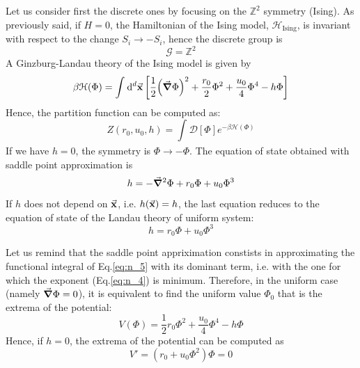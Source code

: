 \documentclass[../main/main.tex]{subfiles}
\begin{document}
Let us consider first the discrete ones by focusing on the \( \mathbb{Z}^2 \) symmetry (Ising).
As previously said, if \( H=0 \), the Hamiltonian of the Ising model, \( \mathcal{H}_{\text{Ising}} \), is invariant with respect to the change \( S_i \rightarrow -S_i \), hence the discrete group is
\begin{equation*}
  \mathcal{G} = \mathbb{Z}^2
\end{equation*}
A Ginzburg-Landau theory of the Ising model is given by
\begin{equation}
   \beta \mathcal{H} (\Phi ) = \int_{}^{} \dd[d]{\va{x}} \qty[ \frac{1}{2} \qty(\va{\grad } \Phi )^2 + \frac{r_0}{2} \Phi ^2 + \frac{u_0}{4} \Phi ^4 - h \Phi ]
  \label{eq:n_4}
\end{equation}
Hence, the partition function can be computed as:
\begin{equation}
  Z (r_0,u_0,h) = \int_{}^{} \mathcal{D} [\Phi]  e^{-\beta \mathcal{H} (\Phi )}
  \label{eq:n_5}
\end{equation}
If we have \( h=0 \), the symmetry is \( \Phi \rightarrow - \Phi  \).
The equation of state obtained with saddle point approximation is
\begin{equation*}
  h = - \va{\grad } ^2 \Phi + r_0 \Phi + u_0 \Phi ^3
\end{equation*}
If \( h \) does not depend on \( \va{x} \), i.e. \( h(\va{x})=h \), the last equation reduces to the equation of state of the Landau theory of uniform system:
\begin{equation*}
  h =  r_0 \Phi + u_0 \Phi ^3
\end{equation*}

Let us remind that the saddle point appriximation constists in approximating the functional integral of Eq.\eqref{eq:n_5} with its dominant term, i.e. with the one for which the exponent (Eq.\eqref{eq:n_4}) is minimum. Therefore, in the uniform case (namely \( \va{\grad } \Phi = 0 \)), it is equivalent to find the uniform value \( \Phi _0 \)  that is the extrema of the potential:
\begin{equation*}
  V (\Phi ) = \frac{1}{2} r_0 \Phi ^2 + \frac{u_0}{4} \Phi ^4 - h \Phi
\end{equation*}
Hence, if \( h=0 \), the extrema of the potential can be computed as
\begin{equation*}
  V' = (r_0 + u_0 \Phi ^2) \Phi = 0
\end{equation*}
\end{document}
